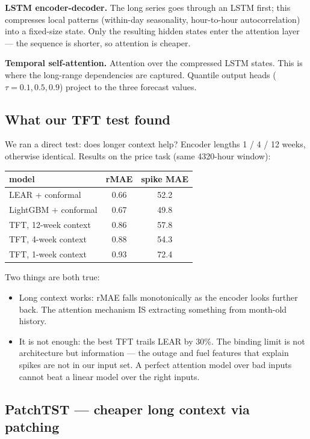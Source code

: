\textbf{LSTM encoder-decoder.} The long series goes through an LSTM
first; this compresses local patterns (within-day seasonality, hour-to-hour
autocorrelation) into a fixed-size state. Only the resulting hidden states
enter the attention layer --- the sequence is shorter, so attention is cheaper.

\textbf{Temporal self-attention.} Attention over the compressed LSTM
states. This is where the long-range dependencies are captured.
Quantile output heads ($\tau = 0.1, 0.5, 0.9$) project to the three
forecast values.

\subsection{What our TFT test found}

We ran a direct test: does longer context help? Encoder lengths
1 / 4 / 12 weeks, otherwise identical. Results on the price task
(same 4320-hour window):

\begin{center}
\begin{tabular}{lcc}
model & rMAE & spike MAE \\
\hline
LEAR + conformal & 0.66 & 52.2 \\
LightGBM + conformal & 0.67 & 49.8 \\
TFT, 12-week context & 0.86 & 57.8 \\
TFT, 4-week context & 0.88 & 54.3 \\
TFT, 1-week context & 0.93 & 72.4 \\
\end{tabular}
\end{center}

Two things are both true:

\begin{itemize}
  \item Long context works: rMAE falls monotonically as the encoder
        looks further back. The attention mechanism IS extracting
        something from month-old history.
  \item It is not enough: the best TFT trails LEAR by 30\%. The binding
        limit is not architecture but information --- the outage and
        fuel features that explain spikes are not in our input set.
        A perfect attention model over bad inputs cannot beat a linear
        model over the right inputs.
\end{itemize}

\subsection{PatchTST --- cheaper long context via patching}

